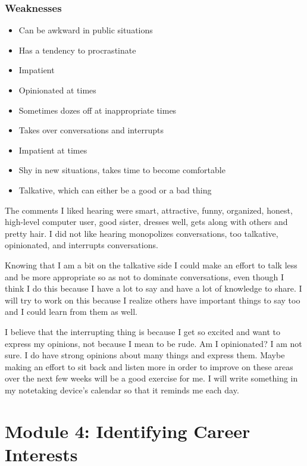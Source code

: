 \subsubsection*{Weaknesses}
\begin{itemize}[leftmargin=1.0cm]
	\item Can be awkward in public situations
	\item Has a tendency to procrastinate
	\item Impatient
	\item Opinionated at times
	\item Sometimes dozes off at inappropriate times
	\item Takes over conversations and interrupts
	\item Impatient at times
	\item Shy in new situations, takes time to become comfortable
	\item Talkative, which can either be a good or a bad thing
\end{itemize}
The comments I liked hearing were smart, attractive, funny, organized, honest, high-level computer user, good sister, dresses well, gets along with others and pretty hair. I did not like hearing monopolizes conversations, too talkative, opinionated, and interrupts conversations.

Knowing that I am a bit on the talkative side I could make an effort to talk less and be more appropriate so as not to dominate conversations, even though I think I do this because I have a lot to say and have a lot of knowledge to share. I will try to work on this because I realize others have important things to say too and I could learn from them as well.

I believe that the interrupting thing is because I get so excited and want to express my opinions, not because I mean to be rude. Am I opinionated? I am not sure. I do have strong opinions about many things and express them. Maybe making an effort to sit back and listen more in order to improve on these areas over the next few weeks will be a good exercise for me. I will write something in my notetaking device's calendar so that it reminds me each day.


\pagebreak \section*{Module 4:  Identifying Career Interests}
\noindent\makebox[\textwidth]{\rule{\linewidth}{0.4pt}} 
\localtableofcontents
\noindent\makebox[\textwidth]{\rule{\linewidth}{0.4pt}}


